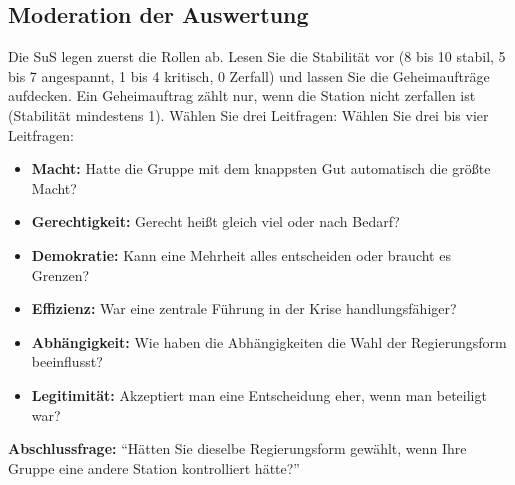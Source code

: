 \subsection*{Moderation der Auswertung}
Die SuS legen zuerst die Rollen ab. Lesen Sie die Stabilität vor (8 bis 10 stabil, 5 bis 7 angespannt, 1 bis 4 kritisch, 0 Zerfall) und lassen Sie die Geheimaufträge aufdecken. Ein Geheimauftrag zählt nur, wenn die Station nicht zerfallen ist (Stabilität mindestens 1).
\ifkurz
Wählen Sie drei Leitfragen:
\else
Wählen Sie drei bis vier Leitfragen:
\fi
\begin{itemize}
  \item \textbf{Macht:} Hatte die Gruppe mit dem knappsten Gut automatisch die größte Macht?
  \item \textbf{Gerechtigkeit:} Gerecht heißt gleich viel oder nach Bedarf?
  \item \textbf{Demokratie:} Kann eine Mehrheit alles entscheiden oder braucht es Grenzen?
  \item \textbf{Effizienz:} War eine zentrale Führung in der Krise handlungsfähiger?
  \item \textbf{Abhängigkeit:} Wie haben die Abhängigkeiten die Wahl der Regierungsform beeinflusst?
  \item \textbf{Legitimität:} Akzeptiert man eine Entscheidung eher, wenn man beteiligt war?
\end{itemize}
\textbf{Abschlussfrage:} \enquote{Hätten Sie dieselbe Regierungsform gewählt, wenn Ihre Gruppe eine andere Station kontrolliert hätte?}

